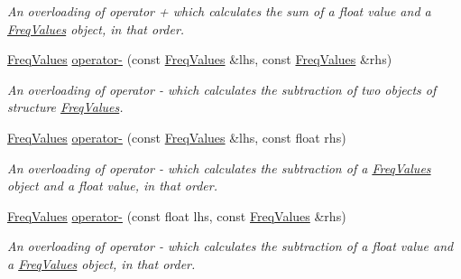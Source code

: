 \begin{DoxyCompactItemize}
\begin{DoxyCompactList}\small\item\em An overloading of operator + which calculates the sum of a {\itshape float} value and a {\itshape \hyperlink{structFreqValues}{Freq\+Values}} object, in that order. \end{DoxyCompactList}\item 
\mbox{\label{structFreqValues_a05184c79e4dadc7a4e1f3a76fba1c3c8}} 
\hyperlink{structFreqValues}{Freq\+Values} \hyperlink{structFreqValues_a05184c79e4dadc7a4e1f3a76fba1c3c8}{operator-\/} (const \hyperlink{structFreqValues}{Freq\+Values} \&lhs, const \hyperlink{structFreqValues}{Freq\+Values} \&rhs)
\begin{DoxyCompactList}\small\item\em An overloading of operator -\/ which calculates the subtraction of two objects of structure {\itshape \hyperlink{structFreqValues}{Freq\+Values}}. \end{DoxyCompactList}\item 
\mbox{\label{structFreqValues_ade558a5146a3dbea46f85e64d959ff3d}} 
\hyperlink{structFreqValues}{Freq\+Values} \hyperlink{structFreqValues_ade558a5146a3dbea46f85e64d959ff3d}{operator-\/} (const \hyperlink{structFreqValues}{Freq\+Values} \&lhs, const float rhs)
\begin{DoxyCompactList}\small\item\em An overloading of operator -\/ which calculates the subtraction of a {\itshape \hyperlink{structFreqValues}{Freq\+Values}} object and a {\itshape float} value, in that order. \end{DoxyCompactList}\item 
\mbox{\label{structFreqValues_aa248d5bc83ba0c614137b042947064a8}} 
\hyperlink{structFreqValues}{Freq\+Values} \hyperlink{structFreqValues_aa248d5bc83ba0c614137b042947064a8}{operator-\/} (const float lhs, const \hyperlink{structFreqValues}{Freq\+Values} \&rhs)
\begin{DoxyCompactList}\small\item\em An overloading of operator -\/ which calculates the subtraction of a {\itshape float} value and a {\itshape \hyperlink{structFreqValues}{Freq\+Values}} object, in that order. \end{DoxyCompactList}\item 
\mbox{\label{structFreqValues_a3e567844a5d4347e3b30e696132bfb7c}} 

\end{DoxyCompactItemize}
